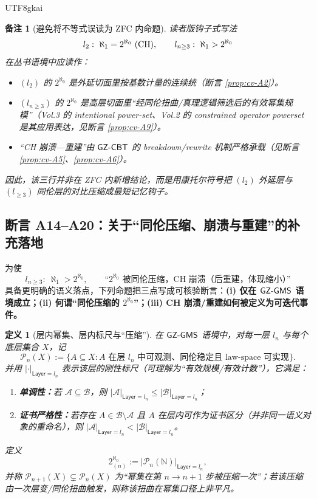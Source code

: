 \documentclass[12pt]{article}
\newtheorem{definition}{定义}[section]
\newtheorem{remark}{备注}[section]
\begin{document}
\begin{CJK*}{UTF8}{gkai}
\begin{remark}[避免将不等式误读为 ZFC 内命题]
读者版钩子式写法
\[
  l_2:\ \aleph_1=2^{\aleph_0}\ (\CHcantor),\qquad
  l_{n\ge3}:\ \aleph_1>2^{\aleph_0}
\]
在丛书语境中应读作：
\begin{itemize}
  \item $(l_2)$ 的 $2^{\aleph_0}$ 是外延切面里按基数计量的连续统（断言 \ref{prop:cv-A2}）。
  \item $(l_{n\ge3})$ 的 $2^{\aleph_0}$ 是高层切面里“经同伦扭曲/真理逻辑筛选后的有效幂集规模”（Vol.3 的 intentional power-set、Vol.2 的 constrained
    operator powerset 是其应用表达，见断言 \ref{prop:cv-A9}）。
  \item “CH 崩溃—重建”由 $\mathsf{GZ\text{-}CBT}$ 的 breakdown/rewrite 机制严格承载（见断言 \ref{prop:cv-A5}、\ref{prop:cv-A6}）。
\end{itemize}
因此，该三行并非在 ZFC 内新增结论，而是用康托尔符号把 $(l_2)$ 外延层与 $(l_{\ge3})$ 同伦层的对比压缩成最短记忆钩子。
\end{remark}

\subsection{断言 A14--A20：关于“同伦压缩、崩溃与重建”的补充落地}

为使
\[
  l_{n\ge 3}:\ \aleph_1>2^{\aleph_0},
  \qquad
  \text{“$2^{\aleph_0}$ 被同伦压缩，CH 崩溃（后重建，体现缩小）”}
\]
具备更明确的语义落点，下列命题把三点写成可核验断言：\textbf{(i) 仅在 $\mathsf{GZ\text{-}GMS}$ 语境成立；(ii) 何谓“同伦压缩的 $2^{\aleph_0}$”；(iii) CH 崩溃/重建如何被定义为可迭代事件。}

\begin{definition}[层内幂集、层内标尺与“压缩”]\label{def:cv-layer-powerset}
在 $\mathsf{GZ\text{-}GMS}$ 语境中，对每一层 $l_n$ 与每个底层集合 $X$，记
\[
  \mathcal P_n(X):=\{A\subseteq X: A \text{ 在层 } l_n \text{ 中可观测、同伦稳定且 law-space 可实现}\}.
\]
并用 $|\cdot|_{\mathsf{Layer}=l_n}$ 表示该层的\emph{刚性标尺}（可理解为“有效规模/有效计数”），它满足：
\begin{enumerate}
  \item \textbf{单调性：}若 $\mathcal A\subseteq\mathcal B$，则 $|\mathcal A|_{\mathsf{Layer}=l_n}\le |\mathcal
    B|_{\mathsf{Layer}=l_n}$；
  \item \textbf{证书严格性：}若存在 $A\in\mathcal B\setminus\mathcal A$ 且 $A$ 在层内可作为证书区分（并非同一语义对象的重命名），则 $|\mathcal
    A|_{\mathsf{Layer}=l_n}<|\mathcal B|_{\mathsf{Layer}=l_n}$。
\end{enumerate}
定义
\[
  2^{\aleph_0}_{(n)}:=\bigl|\mathcal P_n(\mathbb N)\bigr|_{\mathsf{Layer}=l_n},
\]
并称 $\mathcal P_{n+1}(X)\subsetneq\mathcal P_n(X)$ 为“幂集在第 $n\to n{+}1$ 步被压缩一次”；若该压缩由一次层变/同伦扭曲触发，则称该扭曲在幂集口径上\emph{非平凡}。
\end{definition}


\end{CJK*}
\end{document}
